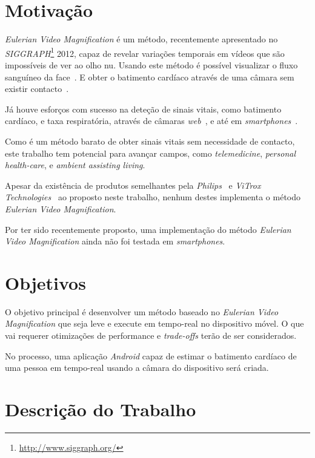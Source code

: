 \documentclass[9pt,a4paper]{extarticle}
\newcommand{\evm}{\emph{Eulerian Video Magnification}}
\begin{document}
\begin{multicols}{2}

\section{Motivação}\label{sec:motivation}

\evm{} é um método, recentemente apresentado no
\emph{SIGGRAPH}\footnote{\url{http://www.siggraph.org/}} 2012, capaz de revelar
variações temporais em vídeos que são impossíveis de ver ao olho nu. Usando
este método é possível visualizar o fluxo sanguíneo da
face~\cite{Wu2012Eulerian}. E obter o batimento cardíaco através de uma câmara
sem existir contacto~\cite{Wu2012Eulerian, Poh2010Non, Poh2011Advancements}.

Já houve esforços com sucesso na deteção de sinais vitais, como
batimento cardíaco, e taxa respiratória, através de câmaras
\emph{web}~\cite{Wu2012Eulerian, Poh2010Non, Poh2011Advancements}, e até
em \emph{smartphones}~\cite{Vitrox2013, Philips2013}.

Como é um método barato de obter sinais vitais sem necessidade de contacto,
este trabalho tem potencial para avançar campos, como \emph{telemedicine},
\emph{personal health-care}, e \emph{ambient assisting living}.

Apesar da existência de produtos semelhantes pela
\emph{Philips}~\cite{Philips2013} e \emph{ViTrox Technologies}~\cite{Vitrox2013}
ao proposto neste trabalho, nenhum destes implementa o método \evm{}.

Por ter sido recentemente proposto, uma implementação do método \evm{} ainda
não foi testada em \emph{smartphones}.

\section{Objetivos}\label{sec:objectives}

O objetivo principal é desenvolver um método baseado no \evm{} que seja
leve e execute em tempo-real no dispositivo móvel. O que vai requerer
otimizações de performance e \emph{trade-offs} terão de ser considerados.

No processo, uma aplicação \emph{Android} capaz de estimar o batimento
cardíaco de uma pessoa em tempo-real usando a câmara do dispositivo
será criada.

\section{Descrição do Trabalho}\label{sec:work}


\end{multicols}
\end{document}
